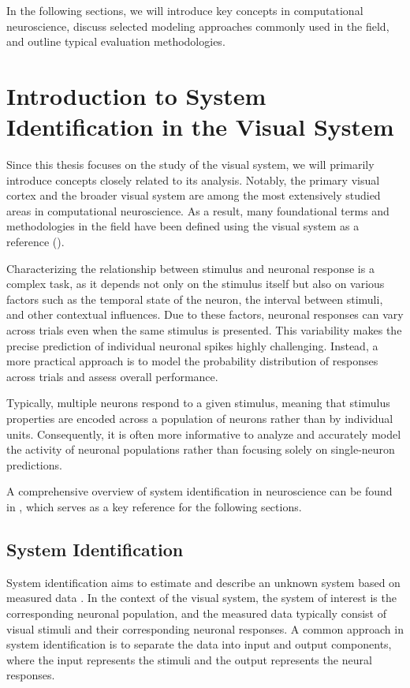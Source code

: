 In the following sections, we will introduce key concepts in computational neuroscience, discuss selected modeling approaches commonly used in the field, and outline typical evaluation methodologies.

\section{Introduction to System Identification in the Visual System}
\label{sec:system_identification}

Since this thesis focuses on the study of the visual system, we will primarily introduce concepts closely related to its analysis. Notably, the primary visual cortex and the broader visual system are among the most extensively studied areas in computational neuroscience. As a result, many foundational terms and methodologies in the field have been defined using the visual system as a reference (\citet{dayan2005theoretical}).

Characterizing the relationship between stimulus and neuronal response is a complex task, as it depends not only on the stimulus itself but also on various factors such as the temporal state of the neuron, the interval between stimuli, and other contextual influences. Due to these factors, neuronal responses can vary across trials even when the same stimulus is presented. This variability makes the precise prediction of individual neuronal spikes highly challenging. Instead, a more practical approach is to model the probability distribution of responses across trials and assess overall performance.

Typically, multiple neurons respond to a given stimulus, meaning that stimulus properties are encoded across a population of neurons rather than by individual units. Consequently, it is often more informative to analyze and accurately model the activity of neuronal populations rather than focusing solely on single-neuron predictions.

A comprehensive overview of system identification in neuroscience can be found in \citet{annurev:/content/journals/10.1146/annurev-vision-091718-014731}, which serves as a key reference for the following sections.

\subsection{System Identification}
\label{subsec:system_identification}

System identification aims to estimate and describe an unknown system based on measured data \citep{annurev:/content/journals/10.1146/annurev-vision-091718-014731}. In the context of the visual system, the system of interest is the corresponding neuronal population, and the measured data typically consist of visual stimuli and their corresponding neuronal responses. A common approach in system identification is to separate the data into input and output components, where the input represents the stimuli and the output represents the neural responses.

